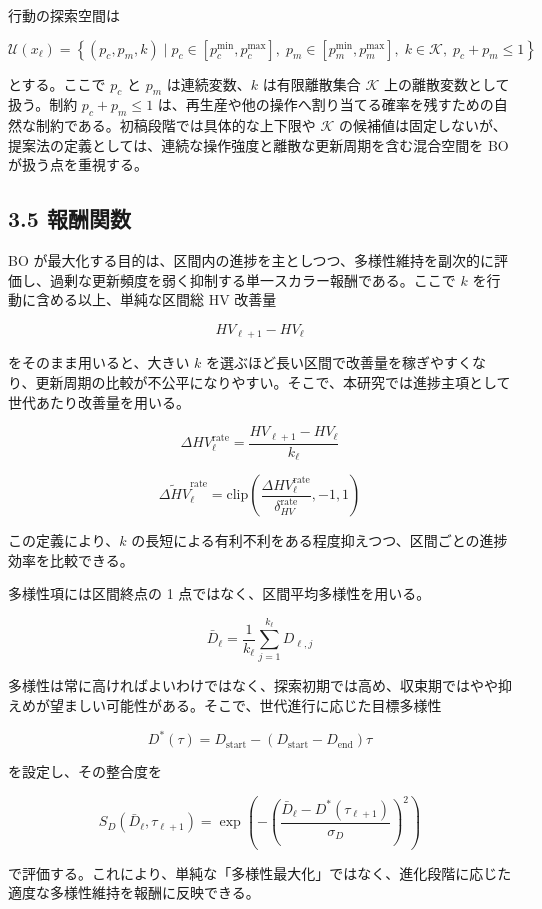 行動の探索空間は

\[
\mathcal{U}(x_\ell)
=
\left\{
(p_c,p_m,k)
\mid
p_c \in [p_c^{\min}, p_c^{\max}],
\;
p_m \in [p_m^{\min}, p_m^{\max}],
\;
k \in \mathcal{K},
\;
p_c + p_m \le 1
\right\}
\]

とする。ここで $p_c$ と $p_m$ は連続変数、$k$ は有限離散集合 $\mathcal{K}$ 上の離散変数として扱う。制約 $p_c + p_m \le 1$ は、再生産や他の操作へ割り当てる確率を残すための自然な制約である。初稿段階では具体的な上下限や $\mathcal{K}$ の候補値は固定しないが、提案法の定義としては、連続な操作強度と離散な更新周期を含む混合空間を BO が扱う点を重視する。

\subsection{3.5 報酬関数}


BO が最大化する目的は、区間内の進捗を主としつつ、多様性維持を副次的に評価し、過剰な更新頻度を弱く抑制する単一スカラー報酬である。ここで $k$ を行動に含める以上、単純な区間総 HV 改善量

\[
HV_{\ell+1} - HV_\ell
\]

をそのまま用いると、大きい $k$ を選ぶほど長い区間で改善量を稼ぎやすくなり、更新周期の比較が不公平になりやすい。そこで、本研究では進捗主項として世代あたり改善量を用いる。

\[
\Delta HV^{\mathrm{rate}}_\ell
=
\frac{HV_{\ell+1} - HV_\ell}{k_\ell}
\]

\[
\widetilde{\Delta HV}^{\mathrm{rate}}_\ell
=
\mathrm{clip}
\left(
\frac{\Delta HV^{\mathrm{rate}}_\ell}{\delta_{HV}^{\mathrm{rate}}},
-1, 1
\right)
\]

この定義により、$k$ の長短による有利不利をある程度抑えつつ、区間ごとの進捗効率を比較できる。

多様性項には区間終点の 1 点ではなく、区間平均多様性を用いる。

\[
\bar{D}_\ell
=
\frac{1}{k_\ell}
\sum_{j=1}^{k_\ell}
D_{\ell,j}
\]

多様性は常に高ければよいわけではなく、探索初期では高め、収束期ではやや抑えめが望ましい可能性がある。そこで、世代進行に応じた目標多様性

\[
D^\ast(\tau)
=
D_{\mathrm{start}}
-
(D_{\mathrm{start}} - D_{\mathrm{end}})\tau
\]

を設定し、その整合度を

\[
S_D(\bar{D}_\ell,\tau_{\ell+1})
=
\exp
\left(
-
\left(
\frac{\bar{D}_\ell - D^\ast(\tau_{\ell+1})}{\sigma_D}
\right)^2
\right)
\]

で評価する。これにより、単純な「多様性最大化」ではなく、進化段階に応じた適度な多様性維持を報酬に反映できる。

